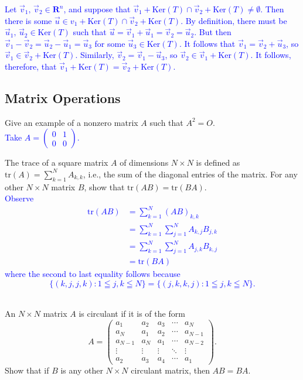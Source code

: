 \documentclass[a4paper,11pt]{article}
\newcommand{\R}{\mathbf{R}}
\newcommand{\BB}[1]{\textcolor{blue}{#1}}
\begin{document}
\begin{enumerate}[(a)]
  \BB{Let $\vec v_1,\,\vec v_2 \in \R^n$, and suppose that $\vec
    v_1+\text{Ker}(T) \cap \vec v_2+\text{Ker}(T) \neq \emptyset$. Then there is
    some $\vec u \in v_1+\text{Ker}(T) \cap \vec v_2+\text{Ker}(T)$. By
    definition, there must be $\vec u_1,\,\vec u_2 \in \text{Ker}(T)$ such that
    $\vec u=\vec v_1+\vec u_1=\vec v_2=\vec u_2$. But then $\vec v_1-\vec
    v_2=\vec u_2-\vec u_1=\vec u_3$ for some $\vec u_3 \in \text{Ker}(T)$. It
    follows that $\vec v_1=\vec v_2+\vec u_3$, so $\vec v_1 \in \vec
    v_2+\text{Ker}(T)$. Similarly, $\vec v_2=\vec v_1-\vec u_3$, so $\vec v_2 \in
    \vec v_1+\text{Ker}(T)$. It follows, therefore, that $\vec
    v_1+\text{Ker}(T)=\vec v_2+\text{Ker}(T)$.}
\end{enumerate}

\subsection*{Matrix Operations}

 Give an example of a nonzero matrix $A$ such
that $A^2=O$. \\

\BB{Take $A=\left( \begin{smallmatrix}0&1\\0&0\end{smallmatrix} \right)$. \\}

 The trace of a square matrix $A$ of dimensions
$N \times N$ is defined as $\text{tr}(A)=\sum_{k=1}^NA_{k,k}$, i.e., the sum of
the diagonal entries of the matrix. For any other $N \times N$ matrix $B$, show
that $\text{tr}(AB)=\text{tr}(BA)$. \\

\BB{Observe
  \begin{align*}
    \text{tr}(AB) &= \sum_{k=1}^N(AB)_{k,k} \\
                  &= \sum_{k=1}^N\sum_{j=1}^NA_{k,j}B_{j,k} \\
                  &= \sum_{k=1}^N\sum_{j=1}^NA_{j,k}B_{k,j} \\
                  &= \text{tr}(BA)
  \end{align*}
  where the second to last equality follows because
  \[
    \{(k,j,j,k) : 1 \leqq j,k \leqq N\} =
    \{(j,k,k,j) : 1 \leqq j,k \leqq N\}.
  \] \\
}

 An $N \times N$ matrix $A$ is circulant if it is
of the form
\[
  A=\begin{pmatrix}
      a_1 & a_2 & a_3 & \cdots & a_N \\
      a_N & a_1 & a_2 & \cdots & a_{N-1} \\
      a_{N-1} & a_N & a_1 & \cdots & a_{N-2} \\
      \vdots & \vdots & \vdots & \ddots & \vdots \\
      a_2 & a_3 & a_4 & \cdots & a_1
    \end{pmatrix}.
\]
Show that if $B$ is any other $N \times N$ circulant matrix, then $AB=BA$. \\
\end{document}
